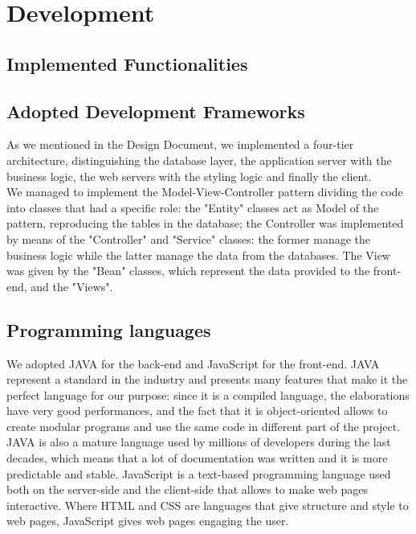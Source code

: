 \section{Development}
\subsection{Implemented Functionalities}

\subsection{Adopted Development Frameworks}

As we mentioned in the Design Document, we implemented a four-tier architecture, distinguishing the database layer, the application server with the business logic, the web servers with the styling logic and finally the client.
\\ We managed to implement the Model-View-Controller pattern dividing the code into classes that had a specific role: the "Entity" classes act as Model of the pattern, reproducing the tables in the database; the Controller was implemented by means of the "Controller" and "Service" classes: the former manage the business logic while the latter manage the data from the databases. The View was given by the "Bean" classes, which represent the data provided to the front-end, and the "Views".

\subsection{Programming languages}

We adopted JAVA for the back-end and JavaScript for the front-end. JAVA represent a standard in the industry and presents many features that make it the perfect language for our purpose: since it is a compiled language, the elaborations have very good performances, and the fact that it is object-oriented allows to create modular programs and use the same code in different part of the project. JAVA is also a mature language used by millions of developers during the last decades, which means that a lot of documentation was written and it is more predictable and stable.
JavaScript is a text-based programming language used both on the server-side and the client-side that allows to make web pages interactive. Where HTML and CSS are languages that give structure and style to web pages, JavaScript gives web pages engaging the user.

